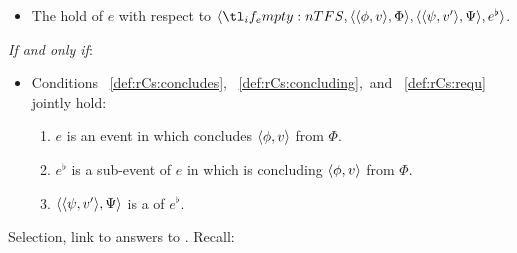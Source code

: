 \begin{note}
  \begin{definition}[\rCon{2}]
    \label{def:rCon}

    \begin{itemize}
    \item
      The \emph{} hold of \(e\) with respect to \(\langle \vAgent{}, \pvp{\phi}{v}{\Phi}, \pvp{\psi}{v'}{\Psi}, e^{\flat} \rangle\).
    \end{itemize}

    \emph{If and only if}:

    \begin{itemize}
    \item
      Conditions~%
      \ref{def:rCs:concludes},~%
      \ref{def:rCs:concluding},~and~%
      \ref{def:rCs:requ}~%
      jointly hold:
    \begin{enumerate}[label=\arabic*., ref=(\arabic*)]
      \item
        \label{def:rCs:concludes}
        \(e\) is an event in which \vAgent{} concludes \(\langle \phi, v \rangle\) from \(\Phi\).
      \item
        \label{def:rCs:concluding}
        \(e^{\flat}\) is a sub-event of \(e\) in which \vAgent{} is concluding \(\langle \phi, v \rangle\) from \(\Phi\).
      \item
        \label{def:rCs:requ}
        \(\langle \langle \psi, v' \rangle, \Psi \rangle\) is a \requ{} of \(e^{\flat}\).
      \end{enumerate}
    \end{itemize}
    \vspace{-1.5\baselineskip}
  \end{definition}
\end{note}


\begin{note}
  Selection, link  to answers to \qWhyV{}.
  Recall:

\end{note}

